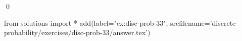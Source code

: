 
\begin{ex} 
  \label{ex:disc-prob-33}
  
  \qed
\end{ex} 
\begin{python0}
from solutions import *
add(label="ex:disc-prob-33",
    srcfilename='discrete-probability/exercises/disc-prob-33/answer.tex') 
\end{python0}
